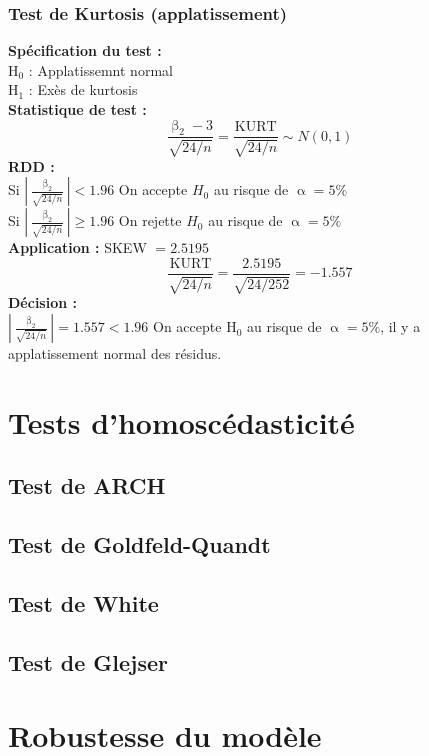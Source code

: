 \documentclass[A4paper]{article}
\begin{document}
\subsubsection{Test de Kurtosis (applatissement)}
\textbf{Spécification du test :} \\
H$_0$ : Applatissemnt normal \\
H$_1$ : Exès de kurtosis \\
\textbf{Statistique de test :}
\begin{equation*}
		\frac{\upbeta_2-3}{\sqrt{24/n}}=  \frac{\text{KURT}}{\sqrt{24/n}} \sim N(0,1)
\end{equation*}
\textbf{RDD :} \\
Si $\left| \frac{\upbeta_2}{\sqrt{24/n}} \right|  < 1.96$ On accepte $H_0$ au risque de $\upalpha = 5\% $\\
Si $\left| \frac{\upbeta_2}{\sqrt{24/n}} \right|  \geq 1.96$ On rejette $H_0$ au risque de $\upalpha = 5\%$ \\
\textbf{Application :} SKEW $= 2.5195 $
\begin{equation*}
	\frac{\text{KURT}}{\sqrt{24/n}} = \frac{2.5195}{\sqrt{24/252}} = -1.557
\end{equation*}
\textbf{Décision :}\\
$\left| \frac{\upbeta_2}{\sqrt{24/n}} \right| = 1.557 < 1.96 $ On accepte H$_0$ au risque de  $\upalpha=5\%$, il y a applatissement normal des résidus.


\section{Tests d'homoscédasticité}
\subsection{Test de ARCH}
\subsection{Test de Goldfeld-Quandt}
\subsection{Test de White}
\subsection{Test de Glejser}

\section{Robustesse du modèle}
\end{document}
